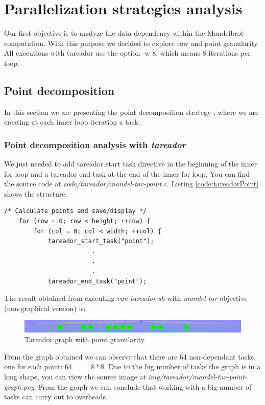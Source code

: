 \documentclass{article}
\begin{document}
\section{Parallelization strategies analysis}
\begin{flushleft}
Our first objective is to analyze the data dependency within the Mandelbrot computation. With this purpose we decided to explore row and point granularity. All executions with tareador use the option -w 8, which means 8 iterations per loop.
\end{flushleft}
\subsection{Point decomposition}
In this section we are presenting the point decomposition strategy , where we are creating at each inner loop iteration a task.
\subsubsection*{Point decomposition analysis with \textit{tareador}}
We just needed to add tareador start task directive in the beginning of the inner for loop and a tareador end task at the end of the inner for loop. You can find the source code at \textit{code/tareador/mandel-tar-point.c}. Listing \ref{code:tareadorPoint} shows the structure.

\begin{lstlisting}[caption={Tareador instrumentation at point granularity},label=code:tareadorPoint]
    /* Calculate points and save/display */
    for (row = 0; row < height; ++row) {
        for (col = 0; col < width; ++col) {
            tareador_start_task("point");
                        .
                        .
                        .
            tareador_end_task("point"); 
\end{lstlisting}

\begin{flushleft}
The result obtained from executing \textit{run-tareador.sh} with \textit{mandel-tar} objective (non-graphical version) is:
\end{flushleft}
\begin{figure}[ht]
    \centering
    \includegraphics[width=1\textwidth]{mandel-tar-point-graph.png}
    \caption{Tareador graph with point granularity}
    \label{fig:tareadorpoint}
\end{figure}
\begin{flushleft}
From the graph obtained we can observe that there are 64 non-dependant tasks, one for each point: $64 == 8*8$. 
Due to the big number of tasks the graph is in a long shape, you can view the source image at \textit{img/tareador/mandel-tar-point-graph.png}. From the graph we can conclude that working with a big number of tasks can carry out to overheads. 
\end{flushleft}
\newpage
\end{document}
